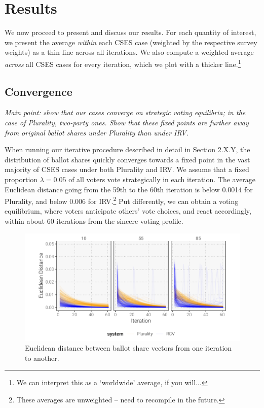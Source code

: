\documentclass[12pt, letter]{article}
\begin{document}

\section{Results}

We now proceed to present and discuss our results. For each quantity of interest, we present the average \emph{within} each CSES case (weighted by the respective survey weights) as a thin line across all iterations. We also compute a weighted average \emph{across} all CSES cases for every iteration, which we plot with a thicker line.\footnote{We can interpret this as a `worldwide' average, if you will...}

\subsection{Convergence}

\textit{Main point: show that our cases converge on strategic voting equilibria; in the case of Plurality, two-party ones. Show that these fixed points are further away from original ballot shares under Plurality than under IRV.}

When running our iterative procedure described in detail in Section 2.X.Y, the distribution of ballot shares quickly converges towards a fixed point in the vast majority of CSES cases under both Plurality and IRV. We assume that a fixed proportion $\lambda = 0.05$ of all voters vote strategically in each iteration. The average Euclidean distance going from the 59th to the 60th iteration is below 0.0014 for Plurality, and below 0.006 for IRV.\footnote{These averages are unweighted -- need to recompile in the future.} Put differently, we can obtain a voting equilibrium, where voters anticipate others' vote choices, and react accordingly, within about 60 iterations from the sincere voting profile.

\begin{figure}[!tbh]
	\centering
	\includegraphics[width = \textwidth]{../output/figures/euclidean}
	\caption{Euclidean distance between ballot share vectors from one iteration to another.}
	\label{fig:convergence}
\end{figure}
\end{document}
